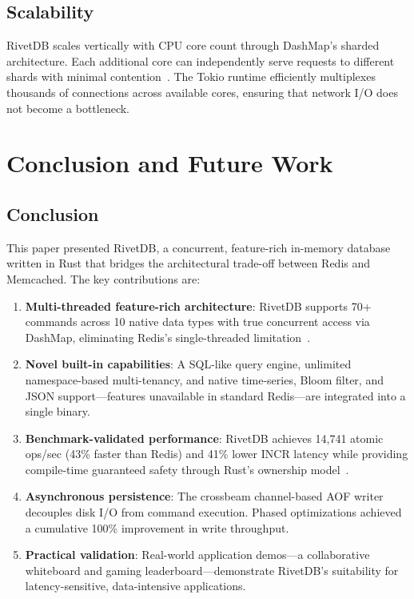 \documentclass[conference,a4paper]{IEEEtran}
\begin{document}
\subsection{Scalability}

RivetDB scales vertically with CPU core count through DashMap's sharded architecture. Each additional core can independently serve requests to different shards with minimal contention~\cite{yadav2024}. The Tokio runtime efficiently multiplexes thousands of connections across available cores, ensuring that network I/O does not become a bottleneck.

\section{Conclusion and Future Work}

\subsection{Conclusion}

This paper presented RivetDB, a concurrent, feature-rich in-memory database written in Rust that bridges the architectural trade-off between Redis and Memcached. The key contributions are:

\begin{enumerate}
    \item \textbf{Multi-threaded feature-rich architecture}: RivetDB supports 70+ commands across 10 native data types with true concurrent access via DashMap, eliminating Redis's single-threaded limitation~\cite{kumar2023}.

    \item \textbf{Novel built-in capabilities}: A SQL-like query engine, unlimited namespace-based multi-tenancy, and native time-series, Bloom filter, and JSON support---features unavailable in standard Redis---are integrated into a single binary.

    \item \textbf{Benchmark-validated performance}: RivetDB achieves 14,741 atomic ops/sec (43\% faster than Redis) and 41\% lower INCR latency while providing compile-time guaranteed safety through Rust's ownership model~\cite{jung2021}.

    \item \textbf{Asynchronous persistence}: The crossbeam channel-based AOF writer decouples disk I/O from command execution. Phased optimizations achieved a cumulative 100\% improvement in write throughput.

    \item \textbf{Practical validation}: Real-world application demos---a collaborative whiteboard and gaming leaderboard---demonstrate RivetDB's suitability for latency-sensitive, data-intensive applications.
\end{enumerate}
\end{document}
